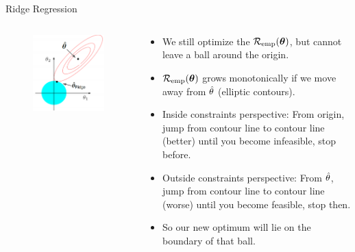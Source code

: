 \documentclass[11pt,compress,t,notes=noshow, xcolor=table]{beamer}
\begin{document}
\begin{vbframe}{Ridge Regression}
\framebreak
  
\begin{columns}
\begin{column}{0.5\textwidth}
\begin{figure}
\includegraphics[width=\textwidth]{figure_man/ridge_hat.png}
\end{figure}
\end{column}

\begin{column}{0.5\textwidth}
\begin{footnotesize} 
\begin{itemize}
  \item We still optimize the $\mathcal{R}_{\text{emp}}(\bm{\theta})$, but cannot leave a ball around the origin.
  \item $\mathcal{R}_{\text{emp}}(\bm{\theta})$ grows monotonically if we move away from $\hat{\theta}$ (elliptic contours).
  \item Inside constraints perspective: From origin, jump from contour line to contour line (better) until you become infeasible, stop before.
\item Outside constraints perspective: From $\hat{\theta}$, jump from contour line to contour line (worse) until you become feasible, stop then.
  \item So our new optimum will lie on the boundary of that ball.
\end{itemize}
\end{footnotesize}
\end{column}
\end{columns}


\end{vbframe}
\end{document}

